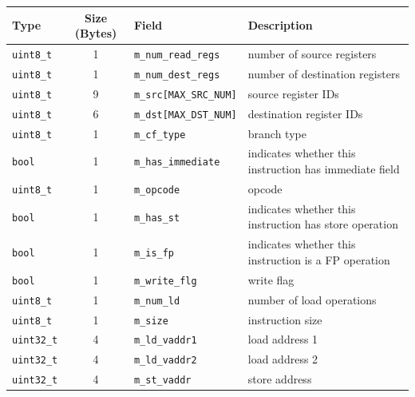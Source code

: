 \vspace{0.2in}
\begin{footnotesize}
\begin{tabular}{l c l l}
Type            & Size (Bytes) & Field                     & Description                                            \\ \hline \hline
\Verb+uint8_t+  & 1            & \Verb+m_num_read_regs+    & number of source registers                             \\
\Verb+uint8_t+  & 1            & \Verb+m_num_dest_regs+    & number of destination registers                        \\
\Verb+uint8_t+  & 9            & \Verb+m_src[MAX_SRC_NUM]+ & source register IDs                                    \\
\Verb+uint8_t+  & 6            & \Verb+m_dst[MAX_DST_NUM]+ & destination register IDs                               \\
\Verb+uint8_t+  & 1            & \Verb+m_cf_type+          & branch type                                            \\
\Verb+bool+     & 1            & \Verb+m_has_immediate+    & indicates whether this instruction has immediate field \\
\Verb+uint8_t+  & 1            & \Verb+m_opcode+           & opcode                                                 \\
\Verb+bool+     & 1            & \Verb+m_has_st+           & indicates whether this instruction has store operation \\
\Verb+bool+     & 1            & \Verb+m_is_fp+            & indicates whether this instruction is a FP operation   \\
\Verb+bool+     & 1            & \Verb+m_write_flg+        & write flag                                             \\
\Verb+uint8_t+  & 1            & \Verb+m_num_ld+           & number of load operations                              \\
\Verb+uint8_t+  & 1            & \Verb+m_size+             & instruction size                                       \\
\Verb+uint32_t+ & 4            & \Verb+m_ld_vaddr1+        & load address 1                                         \\
\Verb+uint32_t+ & 4            & \Verb+m_ld_vaddr2+        & load address 2                                         \\
\Verb+uint32_t+ & 4            & \Verb+m_st_vaddr+         & store address                                          \\

\end{tabular}
\end{footnotesize}

